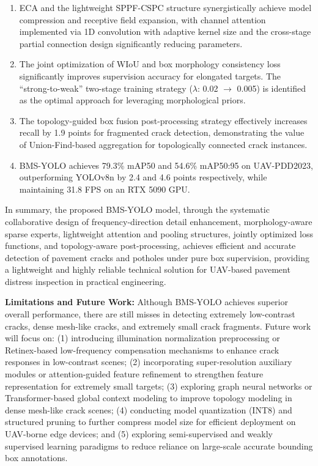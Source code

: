 \documentclass{ieeeaccess}
\begin{document}
{\begin{enumerate}
\item ECA and the lightweight SPPF-CSPC structure synergistically achieve model compression and receptive field expansion, with channel attention implemented via 1D convolution with adaptive kernel size and the cross-stage partial connection design significantly reducing parameters.

\item The joint optimization of WIoU and box morphology consistency loss significantly improves supervision accuracy for elongated targets. The ``strong-to-weak'' two-stage training strategy ($\lambda$: 0.02 $\rightarrow$ 0.005) is identified as the optimal approach for leveraging morphological priors.

\item The topology-guided box fusion post-processing strategy effectively increases recall by 1.9 points for fragmented crack detection, demonstrating the value of Union-Find-based aggregation for topologically connected crack instances.

\item BMS-YOLO achieves 79.3\% mAP50 and 54.6\% mAP50:95 on UAV-PDD2023, outperforming YOLOv8n by 2.4 and 4.6 points respectively, while maintaining 31.8 FPS on an RTX 5090 GPU.
\end{enumerate}

In summary, the proposed BMS-YOLO model, through the systematic collaborative design of frequency-direction detail enhancement, morphology-aware sparse experts, lightweight attention and pooling structures, jointly optimized loss functions, and topology-aware post-processing, achieves efficient and accurate detection of pavement cracks and potholes under pure box supervision, providing a lightweight and highly reliable technical solution for UAV-based pavement distress inspection in practical engineering.

\textbf{Limitations and Future Work:} Although BMS-YOLO achieves superior overall performance, there are still misses in detecting extremely low-contrast cracks, dense mesh-like cracks, and extremely small crack fragments. Future work will focus on: (1) introducing illumination normalization preprocessing or Retinex-based low-frequency compensation mechanisms to enhance crack responses in low-contrast scenes; (2) incorporating super-resolution auxiliary modules or attention-guided feature refinement to strengthen feature representation for extremely small targets; (3) exploring graph neural networks or Transformer-based global context modeling to improve topology modeling in dense mesh-like crack scenes; (4) conducting model quantization (INT8) and structured pruning to further compress model size for efficient deployment on UAV-borne edge devices; and (5) exploring semi-supervised and weakly supervised learning paradigms to reduce reliance on large-scale accurate bounding box annotations.

}
\end{document}
